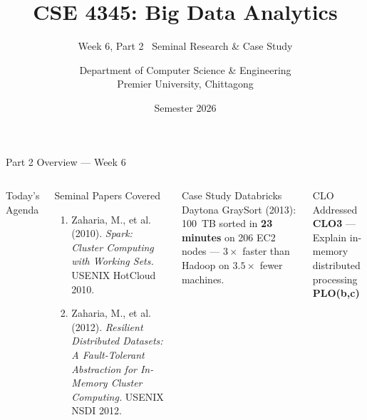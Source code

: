 \documentclass[aspectratio=169,10pt]{beamer}
\title[CSE 4345 \textbar{} Week 6, Part 2]{CSE 4345: Big Data Analytics}
\subtitle{Week 6, Part 2 \textemdash\ Seminal Research \& Case Study}
\author[Dept.\ of CSE]{Department of Computer Science \& Engineering\\[4pt]
       \small Premier University, Chittagong}
\institute{}
\date{Semester 2026}
\begin{document}

\begin{frame}
  \titlepage
\end{frame}

\begin{frame}{Part 2 Overview — Week 6}
  \begin{columns}[T]
      \begin{block}{Today's Agenda}
        \tableofcontents
      \end{block}

      \begin{exampleblock}{Seminal Papers Covered}
        \begin{enumerate}
          \item Zaharia, M., et al. (2010).
                \textit{Spark: Cluster Computing with Working Sets.}
                USENIX HotCloud 2010.
          \item Zaharia, M., et al. (2012).
                \textit{Resilient Distributed Datasets: A Fault-Tolerant
                Abstraction for In-Memory Cluster Computing.}
                USENIX NSDI 2012.
        \end{enumerate}
      \end{exampleblock}
      \vspace{6pt}
      \begin{alertblock}{Case Study}
        Databricks Daytona GraySort (2013): 100~TB sorted in
        \textbf{23 minutes} on 206 EC2 nodes — $3\times$ faster than
        Hadoop on $3.5\times$ fewer machines.
      \end{alertblock}
      \vspace{4pt}
      \begin{block}{CLO Addressed}
        \textbf{CLO3} — Explain in-memory distributed processing\\
        \textbf{PLO(b,c)}
      \end{block}
  \end{columns}
\end{frame}

\end{document}
